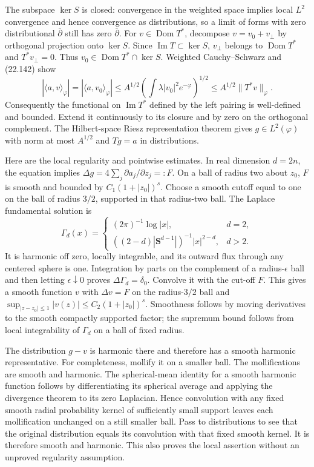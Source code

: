 \documentclass[
  11pt,
  a4paper,
]{article}
\begin{document}
The subspace \(\ker S\) is closed: convergence in the weighted space
implies local \(L^2\) convergence and hence convergence as
distributions, so a limit of forms with zero distributional
\(\bar\partial\) still has zero \(\bar\partial\). For
\(v\in\operatorname{Dom}T^*\), decompose \(v=v_0+v_\perp\) by orthogonal
projection onto \(\ker S\). Since \(\operatorname{Im}T\subset\ker S\),
\(v_\perp\) belongs to \(\operatorname{Dom}T^*\) and \(T^*v_\perp=0\).
Thus \(v_0\in\operatorname{Dom}T^*\cap\ker S\). Weighted Cauchy--Schwarz
and (22.142) show \[
 |\langle a,v\rangle_\varphi|
 =|\langle a,v_0\rangle_\varphi|
 \le A^{1/2}\left(\int\lambda|v_0|^2e^{-\varphi}\right)^{1/2}
 \le A^{1/2}\|T^*v\|_\varphi .
 \tag{22.144}
\] Consequently the functional on \(\operatorname{Im}T^*\) defined by
the left pairing is well-defined and bounded. Extend it continuously to
its closure and by zero on the orthogonal complement. The Hilbert-space
Riesz representation theorem gives \(g\in L^2(\varphi)\) with norm at
most \(A^{1/2}\) and \(Tg=a\) in distributions.

Here are the local regularity and pointwise estimates. In real dimension
\(d=2n\), the equation implies
\(\Delta g=4\sum_j\partial a_j/\partial z_j=:F\). On a ball of radius
two about \(z_0\), \(F\) is smooth and bounded by \(C_1(1+|z_0|)^s\).
Choose a smooth cutoff equal to one on the ball of radius \(3/2\),
supported in that radius-two ball. The Laplace fundamental solution is
\[
 \Gamma_d(x)=
 \begin{cases}
 (2\pi)^{-1}\log|x|,&d=2,\\
 ((2-d)|\mathbf S^{d-1}|)^{-1}|x|^{2-d},&d>2.
 \end{cases}
 \tag{22.145}
\] It is harmonic off zero, locally integrable, and its outward flux
through any centered sphere is one. Integration by parts on the
complement of a radius-\(\epsilon\) ball and then letting
\(\epsilon\downarrow0\) proves \(\Delta\Gamma_d=\delta_0\). Convolve it
with the cut-off \(F\). This gives a smooth function \(v\) with
\(\Delta v=F\) on the radius-\(3/2\) ball and
\(\sup_{|z-z_0|\le1}|v(z)|\le C_2(1+|z_0|)^s\). Smoothness follows by
moving derivatives to the smooth compactly supported factor; the
supremum bound follows from local integrability of \(\Gamma_d\) on a
ball of fixed radius.

The distribution \(g-v\) is harmonic there and therefore has a smooth
harmonic representative. For completeness, mollify it on a smaller ball.
The mollifications are smooth and harmonic. The spherical-mean identity
for a smooth harmonic function follows by differentiating its spherical
average and applying the divergence theorem to its zero Laplacian. Hence
convolution with any fixed smooth radial probability kernel of
sufficiently small support leaves each mollification unchanged on a
still smaller ball. Pass to distributions to see that the original
distribution equals its convolution with that fixed smooth kernel. It is
therefore smooth and harmonic. This also proves the local assertion
without an unproved regularity assumption.
\end{document}
